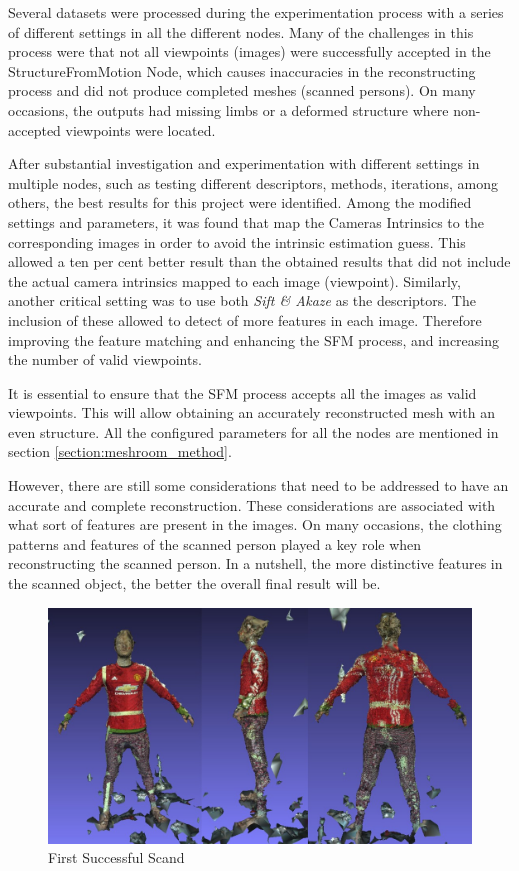 \documentclass[12pt]{report}
\begin{document}
Several datasets were processed during the experimentation process with a series of different settings in all the different nodes. 
Many of the challenges in this process were that not all viewpoints (images) were successfully accepted in the StructureFromMotion Node, which causes inaccuracies in the reconstructing process and did not produce completed meshes (scanned persons).
On many occasions, the outputs had missing limbs or a deformed structure where non-accepted viewpoints were located.

After substantial investigation and experimentation with different settings in multiple nodes, such as testing different descriptors, methods, iterations, among others, the best results for this project were identified.
Among the modified settings and parameters, it was found that map the Cameras Intrinsics to the corresponding images in order to avoid the intrinsic estimation guess. 
This allowed a ten per cent better result than the obtained results that did not include the actual camera intrinsics mapped to each image (viewpoint).
Similarly, another critical setting was to use both \textit{Sift \& Akaze} as the descriptors. The inclusion of these allowed to detect of more features in each image. 
Therefore improving the feature matching and enhancing the SFM process, and increasing the number of valid viewpoints.

It is essential to ensure that the SFM process accepts all the images as valid viewpoints. This will allow obtaining an accurately reconstructed mesh with an even structure.
All the configured parameters for all the nodes are mentioned in section \ref{section:meshroom_method}.

However, there are still some considerations that need to be addressed to have an accurate and complete reconstruction. 
These considerations are associated with what sort of features are present in the images. On many occasions, the clothing patterns and features of the scanned person played a key role when reconstructing the scanned person. 
In a nutshell, the more distinctive features in the scanned object, the better the overall final result will be. 

\begin{figure}[H]%
  \centering
 \includegraphics[width=1\textwidth]{scan1.png}
\caption{First Successful Scand}
\label{fig:scan1} 
\end{figure}
\end{document}
